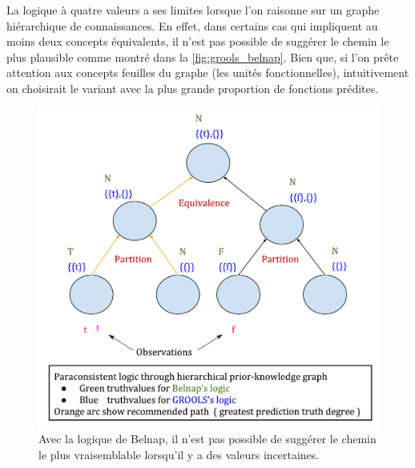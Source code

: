 \begin{refsegment}
La logique à quatre valeurs a ses limites lorsque l'on raisonne sur un graphe hiérarchique de connaissances. En effet, dans certains cas qui impliquent au moins deux concepts équivalents, il n'est pas possible de suggérer le chemin le plus plausible comme montré dans la \cref{fig:grools_belnap}. Bien que, si l'on prête attention aux concepts feuilles du graphe (les unités fonctionnelles), intuitivement on choisirait le variant avec la plus grande proportion de fonctions prédites.

\begin{shadedfigure}[H]
	\begin{subfigure}[t]{.48\textwidth}
		\centering
		\includegraphics[width=\textwidth]{img/GROOLS_vs_belnap_1.pdf}
		\caption{Avec la logique de Belnap, il n'est pas possible de suggérer le chemin le plus vraisemblable lorsqu'il y a des valeurs incertaines.}
		\label{fig:grools_belnap_1}
	\end{subfigure}
	\hfill
	\begin{subfigure}[t]{.48\textwidth}
		\centering

\end{subfigure}
\end{shadedfigure}
\end{refsegment}
